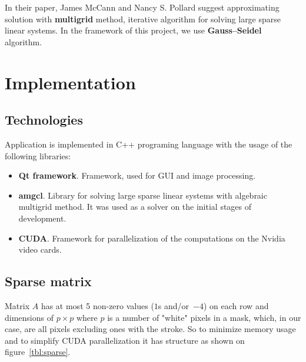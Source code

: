 \documentclass[hidelinks, english]{report}
\begin{document}
In their paper\cite{gradient}, James McCann and Nancy S. Pollard suggest approximating solution with \textbf{multigrid}
method, iterative algorithm for solving large sparse linear systems. In the framework of this project, we use
\textbf{Gauss–Seidel} algorithm.

\section{Implementation}

\subsection{Technologies}

Application is implemented in C++ programing language with the usage of the following libraries:

\begin{itemize}
    \item \textbf{Qt framework}. Framework, used for GUI and image processing.
    \item \textbf{amgcl}. Library for solving large sparse linear systems with algebraic multigrid method. It was used
    as a solver on the initial stages of development.
    \item \textbf{CUDA}. Framework for parallelization of the computations on the Nvidia video cards.
\end{itemize}


\subsection{Sparse matrix}

Matrix $A$ has at most 5 non-zero values ($1$s and/or~$-4$) on each row and dimensions of $p \times p$ where $p$ is
a number of "white" pixels in a mask, which, in our case, are all pixels excluding ones with the stroke. So to minimize
memory usage and to simplify CUDA parallelization it has structure as shown on figure~\ref{tbl:sparse}.
\end{document}
